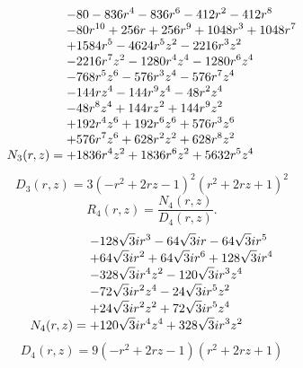 \documentclass[11pt,a4paper]{article}
\begin{document}
\begin{equation}
N_{3}(r,z)=\shortstack[l]{$\displaystyle  - 80 - 836 r^{4} - 836 r^{6} - 412 r^{2} - 412 r^{8}$\\
$\displaystyle  - 80 r^{10} + 256 r + 256 r^{9} + 1048 r^{3} + 1048 r^{7}$\\
$\displaystyle  + 1584 r^{5} - 4624 r^{5} z^{2} - 2216 r^{3} z^{2}$\\
$\displaystyle  - 2216 r^{7} z^{2} - 1280 r^{4} z^{4} - 1280 r^{6} z^{4}$\\
$\displaystyle  - 768 r^{5} z^{6} - 576 r^{3} z^{4} - 576 r^{7} z^{4}$\\
$\displaystyle  - 144 r z^{4} - 144 r^{9} z^{4} - 48 r^{2} z^{4}$\\
$\displaystyle  - 48 r^{8} z^{4} + 144 r z^{2} + 144 r^{9} z^{2}$\\
$\displaystyle  + 192 r^{4} z^{6} + 192 r^{6} z^{6} + 576 r^{3} z^{6}$\\
$\displaystyle  + 576 r^{7} z^{6} + 628 r^{2} z^{2} + 628 r^{8} z^{2}$\\
$\displaystyle  + 1836 r^{4} z^{2} + 1836 r^{6} z^{2} + 5632 r^{5} z^{4}$}
\label{eq:cat-numerator-3}
\end{equation}
\begin{equation}
D_{3}(r,z)=3 \left(- r^{2} + 2 r z - 1\right)^{2} \left(r^{2} + 2 r z + 1\right)^{2}
\label{eq:cat-denominator-3}
\end{equation}
\begin{equation}
R_{4}(r,z)=\frac{N_{4}(r,z)}{D_{4}(r,z)}.
\label{eq:cat-rational-4}
\end{equation}
\begin{equation}
N_{4}(r,z)=\shortstack[l]{$\displaystyle  - 128 \sqrt{3} i r^{3} - 64 \sqrt{3} i r - 64 \sqrt{3} i r^{5}$\\
$\displaystyle  + 64 \sqrt{3} i r^{2} + 64 \sqrt{3} i r^{6} + 128 \sqrt{3} i r^{4}$\\
$\displaystyle  - 328 \sqrt{3} i r^{4} z^{2} - 120 \sqrt{3} i r^{3} z^{4}$\\
$\displaystyle  - 72 \sqrt{3} i r^{2} z^{4} - 24 \sqrt{3} i r^{5} z^{2}$\\
$\displaystyle  + 24 \sqrt{3} i r^{2} z^{2} + 72 \sqrt{3} i r^{5} z^{4}$\\
$\displaystyle  + 120 \sqrt{3} i r^{4} z^{4} + 328 \sqrt{3} i r^{3} z^{2}$}
\label{eq:cat-numerator-4}
\end{equation}
\begin{equation}
D_{4}(r,z)=9 \left(- r^{2} + 2 r z - 1\right) \left(r^{2} + 2 r z + 1\right)
\label{eq:cat-denominator-4}
\end{equation}
\end{document}
